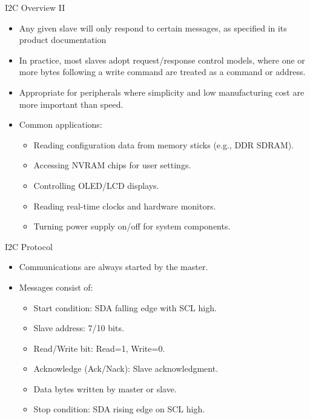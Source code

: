 \begin{frame}{I2C Overview II}
    \begin{itemize}
        \item Any given slave will only respond to certain messages, as specified in its product documentation
        \item In practice, most slaves adopt request/response control models, where one or more bytes following a write command are treated as a command or address.
        \item Appropriate for peripherals where simplicity and low manufacturing cost are more important than speed.
        \item Common applications:
        \begin{itemize}
            \item Reading configuration data from memory sticks (e.g., DDR SDRAM).
            \item Accessing NVRAM chips for user settings.
            \item Controlling OLED/LCD displays.
            \item Reading real-time clocks and hardware monitors.
            \item Turning power supply on/off for system components.
        \end{itemize}
    \end{itemize}
\end{frame}

\begin{frame}{I2C Protocol}
    \begin{itemize}
        \item Communications are always started by the master.
        \item Messages consist of:
        \begin{itemize}
            \item Start condition: SDA falling edge with SCL high.
            \item Slave address: 7/10 bits.
            \item Read/Write bit: Read=1, Write=0.
            \item Acknowledge (Ack/Nack): Slave acknowledgment.
            \item Data bytes written by master or slave.
            \item Stop condition: SDA rising edge on SCL high.
        \end{itemize}
    \end{itemize}
\end{frame}

